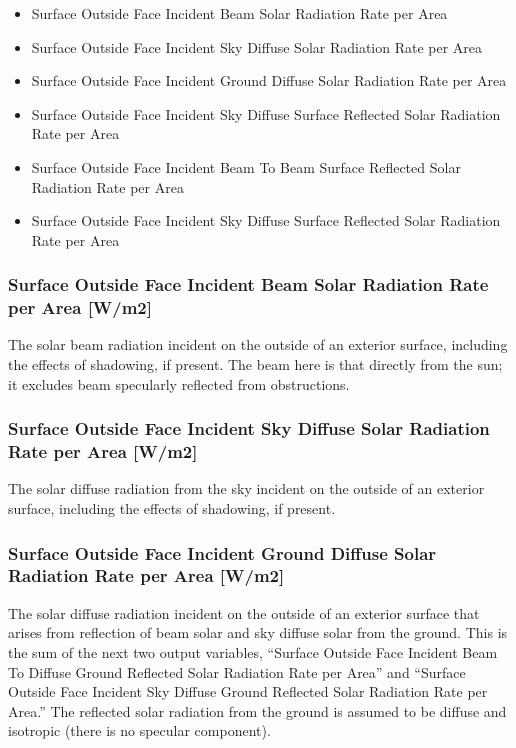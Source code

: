 \begin{itemize}
\item
  Surface Outside Face Incident Beam Solar Radiation Rate per Area
\item
  Surface Outside Face Incident Sky Diffuse Solar Radiation Rate per Area
\item
  Surface Outside Face Incident Ground Diffuse Solar Radiation Rate per Area
\item
  Surface Outside Face Incident Sky Diffuse Surface Reflected Solar Radiation Rate per Area
\item
  Surface Outside Face Incident Beam To Beam Surface Reflected Solar Radiation Rate per Area
\item
  Surface Outside Face Incident Sky Diffuse Surface Reflected Solar Radiation Rate per Area
\end{itemize}

\subsubsection{Surface Outside Face Incident Beam Solar Radiation Rate per Area {[}W/m2{]}}\label{surface-outside-face-incident-beam-solar-radiation-rate-per-area-wm2}

The solar beam radiation incident on the outside of an exterior surface, including the effects of shadowing, if present. The beam here is that directly from the sun; it excludes beam specularly reflected from obstructions.

\subsubsection{Surface Outside Face Incident Sky Diffuse Solar Radiation Rate per Area {[}W/m2{]}}\label{surface-outside-face-incident-sky-diffuse-solar-radiation-rate-per-area-wm2}

The solar diffuse radiation from the sky incident on the outside of an exterior surface, including the effects of shadowing, if present.

\subsubsection{Surface Outside Face Incident Ground Diffuse Solar Radiation Rate per Area {[}W/m2{]}}\label{surface-outside-face-incident-ground-diffuse-solar-radiation-rate-per-area-wm2}

The solar diffuse radiation incident on the outside of an exterior surface that arises from reflection of beam solar and sky diffuse solar from the ground. This is the sum of the next two output variables, ``Surface Outside Face Incident Beam To Diffuse Ground Reflected Solar Radiation Rate per Area'' and ``Surface Outside Face Incident Sky Diffuse Ground Reflected Solar Radiation Rate per Area.'' The reflected solar radiation from the ground is assumed to be diffuse and isotropic (there is no specular component).

